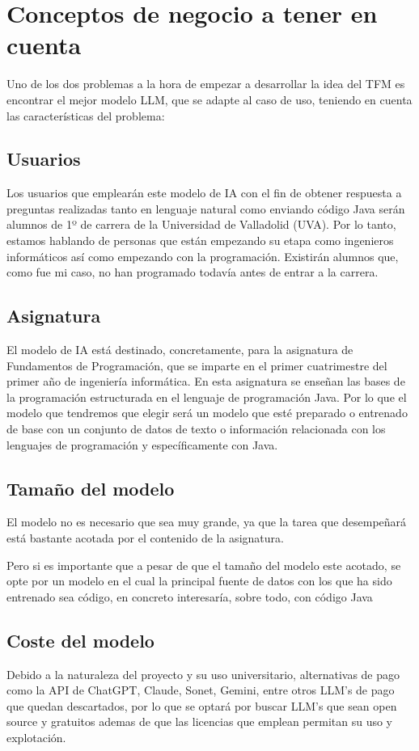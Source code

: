 \section{Conceptos de negocio a tener en cuenta}
Uno de los dos problemas a la hora de empezar a desarrollar la idea del TFM es encontrar el mejor modelo LLM, que se adapte al caso de uso, teniendo en cuenta las características del problema:

\subsection{Usuarios}
Los usuarios que emplearán este modelo de IA con el fin de obtener respuesta a preguntas realizadas tanto en lenguaje natural como enviando código Java serán alumnos de 1º de carrera de la Universidad de Valladolid (UVA). Por lo tanto, estamos hablando de personas que están empezando su etapa como ingenieros informáticos así como empezando con la programación. Existirán alumnos que, como fue mi caso, no han programado todavía antes de entrar a la carrera.

\subsection{Asignatura}
El modelo de IA está destinado, concretamente, para la asignatura de Fundamentos de Programación, que se imparte en el primer cuatrimestre del primer año de ingeniería informática. En esta asignatura se enseñan las bases de la programación estructurada en el lenguaje de programación Java. Por lo que el modelo que tendremos que elegir será un modelo que esté preparado o entrenado de base con un conjunto de datos de texto o información relacionada con los lenguajes de programación y específicamente con Java.

\subsection{Tamaño del modelo}
El modelo no es necesario que sea muy grande, ya que la tarea que desempeñará está bastante acotada por el contenido de la asignatura.

Pero si es importante que a pesar de que el tamaño del modelo este acotado, se opte por un modelo en el cual la principal fuente de datos con los que ha sido entrenado sea código, en concreto interesaría, sobre todo, con código Java

\subsection{Coste del modelo}
Debido a la naturaleza del proyecto y su uso universitario, alternativas de pago como la API de ChatGPT, Claude, Sonet, Gemini, entre otros LLM's de pago que quedan descartados, por lo que se optará por buscar LLM's que sean open source y gratuitos ademas de que las licencias que emplean permitan su uso y explotación.